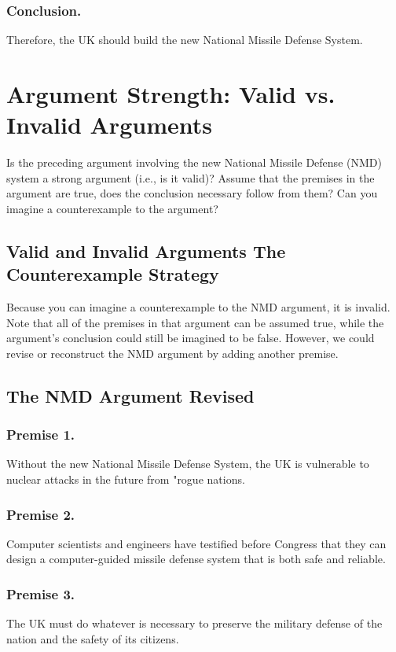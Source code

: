 \documentclass{article}
\begin{document}
\subsubsection{Conclusion.}
Therefore, the UK should build the new National Missile Defense System.

\section{Argument Strength: Valid vs.  Invalid Arguments}

Is the preceding argument involving the new National Missile Defense (NMD) system a strong argument (i.e., is it valid)?
Assume that the premises in the argument are true, does the conclusion necessary follow from them?
Can you imagine a counterexample to the argument?

\subsection{Valid and Invalid Arguments The Counterexample Strategy}

Because you can imagine a counterexample to the NMD argument, it is invalid.
Note that all of the premises in that argument can be assumed true, while the argument’s conclusion could still be imagined to be false.
However, we could revise or reconstruct the NMD argument by adding another premise.

\subsection{The NMD Argument Revised}

\subsubsection{Premise 1.}
Without the new National Missile Defense System, the UK is vulnerable to nuclear attacks in the future from "rogue nations.

\subsubsection{Premise 2.}
Computer scientists and engineers have testified before Congress that they can design a computer-guided missile defense system that is both safe and reliable.

\subsubsection{Premise 3.}
 The UK must do whatever is necessary to preserve the military defense of the nation and the safety of its citizens.
\end{document}
